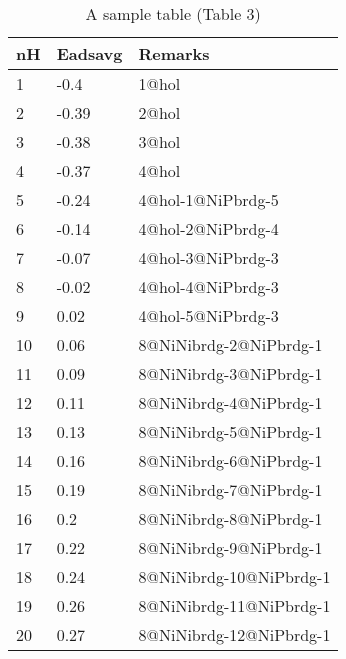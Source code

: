 
\begin{table}[ht]
\centering
\caption{A sample table (Table 3)}
\label{tab:table3}
\begin{tabular}{|l|l|l|}
\hline
nH & Eadsavg & Remarks \\ \hline
1 & -0.4 & 1@hol \\ \hline
2 & -0.39 & 2@hol \\ \hline
3 & -0.38 & 3@hol \\ \hline
4 & -0.37 & 4@hol \\ \hline
5 & -0.24 & 4@hol-1@NiPbrdg-5 \\ \hline
6 & -0.14 & 4@hol-2@NiPbrdg-4 \\ \hline
7 & -0.07 & 4@hol-3@NiPbrdg-3 \\ \hline
8 & -0.02 & 4@hol-4@NiPbrdg-3 \\ \hline
9 & 0.02 & 4@hol-5@NiPbrdg-3 \\ \hline
10 & 0.06 & 8@NiNibrdg-2@NiPbrdg-1 \\ \hline
11 & 0.09 & 8@NiNibrdg-3@NiPbrdg-1 \\ \hline
12 & 0.11 & 8@NiNibrdg-4@NiPbrdg-1 \\ \hline
13 & 0.13 & 8@NiNibrdg-5@NiPbrdg-1 \\ \hline
14 & 0.16 & 8@NiNibrdg-6@NiPbrdg-1 \\ \hline
15 & 0.19 & 8@NiNibrdg-7@NiPbrdg-1 \\ \hline
16 & 0.2 & 8@NiNibrdg-8@NiPbrdg-1 \\ \hline
17 & 0.22 & 8@NiNibrdg-9@NiPbrdg-1 \\ \hline
18 & 0.24 & 8@NiNibrdg-10@NiPbrdg-1 \\ \hline
19 & 0.26 & 8@NiNibrdg-11@NiPbrdg-1 \\ \hline
20 & 0.27 & 8@NiNibrdg-12@NiPbrdg-1 \\ \hline

\end{tabular}
\end{table}

